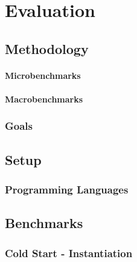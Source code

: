 \chapter{Evaluation}
\label{chap:evalution}



\section{Methodology}
\label{sec:methodology}

\subsubsection{Microbenchmarks}

\subsubsection{Macrobenchmarks}

\subsection{Goals}
\label{subsec:goals}

\section{Setup}
\label{sec:setup}


\subsection{Programming Languages}
\label{subsec:programming-languages}

\section{Benchmarks}
\label{sec:benchmarks}

\subsection{Cold Start - Instantiation}
\label{subsec:cold-start}

